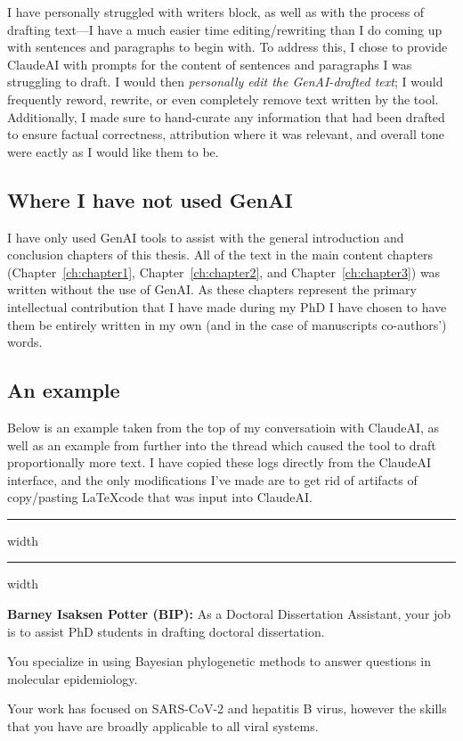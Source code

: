 I have personally struggled with writers block, as well as with the process of drafting text---I have a much easier time editing/rewriting than I do coming up with sentences and paragraphs to begin with.
To address this, I chose to provide ClaudeAI with prompts for the content of sentences and paragraphs I was struggling to draft.
I would then \textit{personally edit the GenAI-drafted text}; I would frequently reword, rewrite, or even completely remove text written by the tool.
Additionally, I made sure to hand-curate any information that had been drafted to ensure factual correctness, attribution where it was relevant, and overall tone were eactly as I would like them to be.

\subsection*{Where I have not used GenAI}
I have only used GenAI tools to assist with the general introduction and conclusion chapters of this thesis.
All of the text in the main content chapters (Chapter~\ref{ch:chapter1}, Chapter~\ref{ch:chapter2}, and Chapter~\ref{ch:chapter3}) was written without the use of GenAI.
As these chapters represent the primary intellectual contribution that I have made during my PhD I have chosen to have them be entirely written in my own (and in the case of manuscripts co-authors') words.

\subsection*{An example}

Below is an example taken from the top of my conversatioin with ClaudeAI, as well as an example from further into the thread which caused the tool to draft proportionally more text.
I have copied these logs directly from the ClaudeAI interface, and the only modifications I've made are to get rid of artifacts of copy/pasting \LaTeX code that was input into ClaudeAI.

\vspace{2em}
\hrule width \hsize \kern 1mm \hrule width \hsize

\textbf{Barney Isaksen Potter (BIP):} As a Doctoral Dissertation Assistant, your job is to assist PhD students in drafting doctoral dissertation.

   You specialize in using Bayesian phylogenetic methods to answer questions in molecular epidemiology.
   
   Your work has focused on SARS-CoV-2 and hepatitis B virus, however the skills that you have are broadly applicable to all viral systems.

